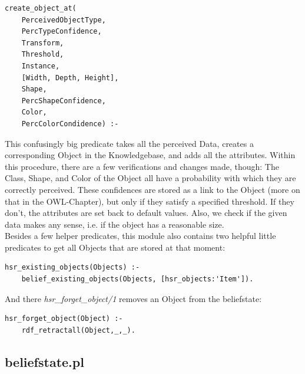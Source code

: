 \documentclass[main.tex]{subfiles}
\begin{document}
\begin{lstlisting}
create_object_at(
	PerceivedObjectType, 
	PercTypeConfidence, 
	Transform, 
	Threshold, 
	Instance, 
	[Width, Depth, Height], 
	Shape, 
	PercShapeConfidence, 
	Color, 
	PercColorCondidence) :-
\end{lstlisting}
This confusingly big predicate takes all the perceived Data, creates a corresponding Object in the Knowledgebase, and adds all the attributes. Within this procedure, there are a few verifications and changes made, though: The Class, Shape, and Color of the Object all have a probability with which they are correctly perceived. These confidences are stored as a link to the Object (more on that in the OWL-Chapter), but only if they satisfy a specified threshold. If they don't, the attributes are set back to default values. Also, we check if the given data makes any sense, i.e. if the object has a reasonable size.\\
Besides a few helper predicates, this module also contains two helpful little predicates to get all Objects that are stored at that moment:
\begin{lstlisting}
hsr_existing_objects(Objects) :-
    belief_existing_objects(Objects, [hsr_objects:'Item']).
\end{lstlisting}
And there \textit{hsr\_forget\_object/1} removes an Object from the beliefstate:
\begin{lstlisting}
hsr_forget_object(Object) :-
    rdf_retractall(Object,_,_).
\end{lstlisting}

\subsection{beliefstate.pl}
\end{document}
